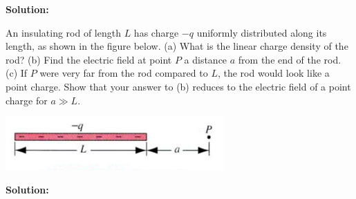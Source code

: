 \documentclass[11pt]{article}
\begin{document}
\textbf{Solution:}


\clearpage

\begin{problem}[E26.18]
An insulating rod of length $L$ has charge $-q$ uniformly distributed along its length, as shown in the figure below. (a) What is the linear charge density of the rod? (b) Find the electric
field at point $P$ a distance $a$ from the end of the rod. (c) If $P$ were very far from the rod compared to $L$, the rod would look like a point charge. Show that your answer to (b) reduces to the electric field of a point charge for $a \gg L$.
\begin{center}
\includegraphics[scale=0.75]{prob6.png}
\end{center}
\end{problem}


\textbf{Solution:}


\clearpage
\end{document}

